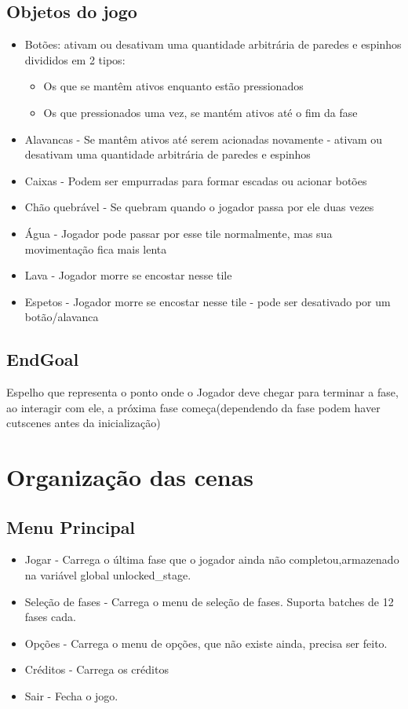 \documentclass[a4paper, 11pt]{article}
\begin{document}
	\subsection{Objetos do jogo} 
		\begin{itemize} 
			\item Botões: ativam ou desativam uma quantidade arbitrária de paredes e espinhos divididos em 2 tipos: 
			\begin{itemize}
			        \item Os que se mantêm ativos enquanto estão pressionados
			        \item Os que pressionados uma vez, se mantém ativos até o fim da fase
			\end{itemize}   
			\item Alavancas - Se mantêm ativos até serem acionadas novamente - ativam ou desativam uma quantidade arbitrária de paredes e espinhos 
			\item Caixas - Podem ser empurradas para formar escadas ou acionar botões 
			\item Chão quebrável - Se quebram quando o jogador passa por ele duas vezes 
			\item Água - Jogador pode passar por esse tile normalmente, mas sua movimentação fica mais lenta 
			\item Lava - Jogador morre se encostar nesse tile 
			\item Espetos - Jogador morre se encostar nesse tile - pode ser desativado por um botão/alavanca 
		\end{itemize} 
 		\subsection{EndGoal}
 			Espelho que representa o ponto onde o Jogador deve chegar para terminar a fase, ao interagir com ele, a próxima fase começa(dependendo da fase podem haver cutscenes antes da inicialização)
	
\section{Organização das cenas} 
		\subsection{Menu Principal} 
			\begin{itemize} 
				\item Jogar - Carrega o última fase que o jogador ainda não completou,armazenado na variável global unlocked\_stage. 
				\item Seleção de fases - Carrega o menu de seleção de fases. Suporta batches de 12 fases cada.
				\item Opções - Carrega o menu de opções, que não existe ainda, precisa ser feito. 
				\item Créditos - Carrega os créditos 
				\item Sair - Fecha o jogo.
			\end{itemize} 
 
\end{document}
